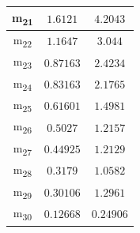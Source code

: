\documentclass[12pt]{article}
\begin{document}
\begin{table}
\begin{tabular}{||c c c||}
			m\textsubscript{21} & $1.6121$ & $4.2043$ \\
			\hline
			m\textsubscript{22} & $1.1647$ & $3.044$ \\
			\hline
			m\textsubscript{23} & $0.87163$ & $2.4234$ \\
			\hline
			m\textsubscript{24} & $0.83163$ & $2.1765$ \\
			\hline
			m\textsubscript{25} & $0.61601$ & $1.4981$ \\
			\hline
			m\textsubscript{26} & $0.5027$ & $1.2157$ \\
			\hline
			m\textsubscript{27} & $0.44925$ & $1.2129$ \\
			\hline
			m\textsubscript{28} & $0.3179$ & $1.0582$ \\
			\hline
			m\textsubscript{29} & $0.30106$ & $1.2961$ \\
			\hline
			m\textsubscript{30} & $0.12668$ & $0.24906$ \\
			\hline
		\end{tabular}
	\label{Tab:Features_4_1}
\end{table}
\end{document}
